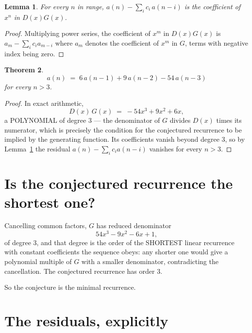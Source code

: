 \documentclass[11pt,a4paper]{article}
\theoremstyle{plain}
\newtheorem{theorem}{Theorem}
\newtheorem{lemma}[theorem]{Lemma}
\theoremstyle{definition}
\begin{document}
\begin{lemma}\label{lem:key}
For every $n$ in range, $a(n)-\sum_i c_i\,a(n-i)$ is the coefficient of $x^{n}$ in
$D(x)G(x)$.
\end{lemma}

\begin{proof}
Multiplying power series, the coefficient of $x^{m}$ in $D(x)G(x)$ is
$a_m-\sum_i c_i a_{m-i}$ where $a_m$ denotes the coefficient of $x^{m}$ in $G$, terms with
negative index being zero.
\end{proof}

\begin{theorem}
\[
a(n)\;=\;6\,a(n-1) + 9\,a(n-2) - 54\,a(n-3)
\]
for every $n>3$.
\end{theorem}

\begin{proof}
In exact arithmetic,
\[
D(x)\,G(x)\;=\;- 54 x^{3} + 9 x^{2} + 6 x,
\]
a POLYNOMIAL of degree $3$ --- the denominator of $G$ divides $D(x)$ times its numerator,
which is precisely the condition for the conjectured recurrence to be implied by the
generating function. Its coefficients vanish beyond degree $3$, so by
Lemma~\ref{lem:key} the residual $a(n)-\sum_ic_ia(n-i)$ vanishes for every
$n>3$.
\end{proof}

\section{Is the conjectured recurrence the shortest one?}

Cancelling common factors, $G$ has reduced denominator
\[
54 x^{3} - 9 x^{2} - 6 x + 1,
\]
of degree $3$, and that degree is the order of the SHORTEST linear recurrence with
constant coefficients the sequence obeys: any shorter one would give a polynomial multiple of
$G$ with a smaller denominator, contradicting the cancellation. The conjectured recurrence has
order $3$.

So the conjecture is the minimal recurrence.

\section{The residuals, explicitly}
\end{document}
